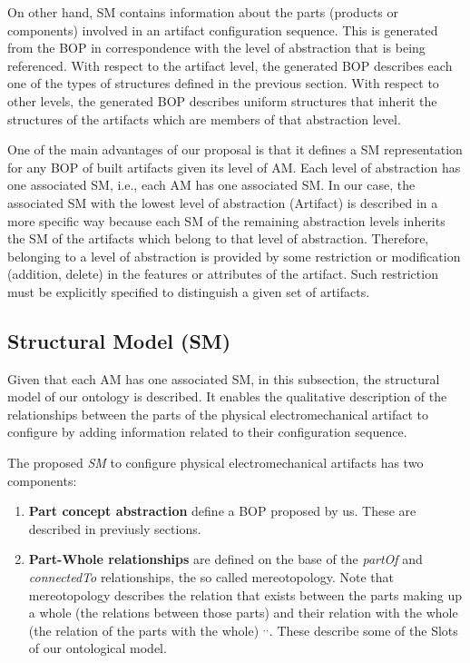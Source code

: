 \documentclass[runningheads,a4paper]{llncs}
\begin{document}
On other hand, SM contains information about the parts (products or components) involved in an artifact configuration sequence. This is generated from the BOP in correspondence with the level of abstraction that is being referenced. With respect to the artifact level, the generated BOP describes each one of the types of structures defined in the previous section. With respect to other levels, the generated BOP describes uniform structures that inherit the structures of the artifacts which are members of that abstraction level. 

One of the main advantages of our proposal is that it defines a SM representation for any BOP of built artifacts given its level of AM. Each level of abstraction has one associated SM, i.e., each AM has one associated SM. In our case, the associated SM with the lowest level of abstraction (Artifact) is described in a more specific way because each SM of the remaining abstraction levels inherits the SM of the artifacts which belong to that level of abstraction. Therefore, belonging to a level of abstraction is provided by some restriction or modification (addition, delete) in the features or attributes of the artifact. Such restriction must be explicitly specified to distinguish a given set of artifacts.

\subsection{Structural Model (SM)}\label{HM}
Given that each AM has one associated SM, in this subsection, the structural model of our ontology is described. It enables the qualitative description of the relationships between the parts of the physical electromechanical artifact to configure by adding information related to their configuration sequence. 

The proposed \emph{SM} to configure physical electromechanical artifacts has two components:
\begin{enumerate}
\item \textbf{Part concept abstraction} define a BOP proposed by us. These are described in previusly sections.
\item \textbf{Part-Whole relationships} are defined on the base of the \textit{partOf} and \textit{connectedTo} relationships, the so called mereotopology. Note that mereotopology describes the relation that exists between the parts making up a whole (the relations between those parts) and their relation with the whole (the relation of the parts with the whole) \cite{smith1996mereotopology}$^,$\cite{varzi1993bbm}$^,$\cite{varzi1996parts}. These describe some of the Slots of our ontological model. 
\end{enumerate}
\end{document}
